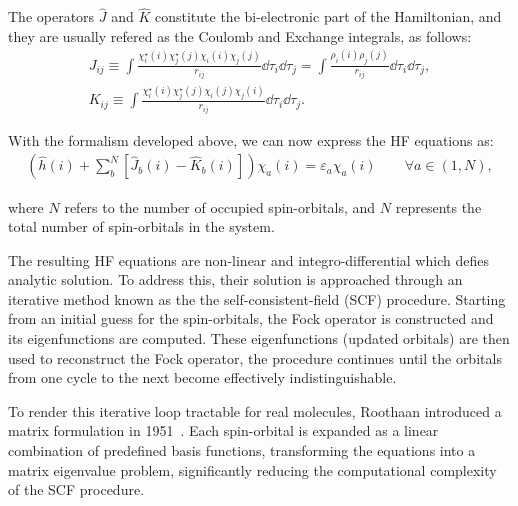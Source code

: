 The operators $\widehat{J}$ and $\hat{K}$ constitute the bi-electronic
part of the Hamiltonian, and they are usually refered as the Coulomb and
Exchange integrals, as follows:
%
\begin{gather}
  J_{ij} \equiv \int\frac{\chi_i^\star(i)\chi_j^\star(j)\chi_i(i)\chi_j(j)}{r_{ij}}
    \dd\tau_i\dd\tau_j =
  \int\frac{\rho_i(i)\rho_j(j)}{r_{ij}}\dd\tau_i\dd\tau_j, \\
  K_{ij} \equiv \int\frac{\chi_i^\star(i)\chi_j^\star(j)\chi_i(j)\chi_j(i)}{r_{ij}}
    \dd\tau_i\dd\tau_j.
\end{gather}
%


\newpage
With the formalism developed above, we can now express the \gls{HF}
equations as:
%
\begin{align}
  \left(\widehat{h}(i) + \sum_b^N [\hat{J}_b (i) - \hat{K}_b (i)]\right)\chi_a (i) =
  \varepsilon_a \chi_a (i) \qquad \forall a \in (1,N),
  \label{HF_forall}
\end{align}

\noindent where $N$ refers to the number of occupied spin-orbitals, and
$N$ represents the total number of spin-orbitals in the system.

The resulting \gls{HF} equations are non-linear and integro-differential which
defies analytic solution. To address this, their solution is approached through
an iterative method known as the the self-consistent-field (\gls{SCF})
procedure. Starting from an initial guess for the spin-orbitals, the Fock
operator is constructed and its eigenfunctions are computed. These
eigenfunctions (updated orbitals) are then used to reconstruct the Fock
operator, the procedure continues until the orbitals from one cycle to the next
become effectively indistinguishable.

To render this iterative loop tractable for real molecules, Roothaan introduced
a matrix formulation in 1951~\cite{Roothaan1951}. Each spin-orbital is expanded
as a linear combination of predefined basis functions, transforming the
equations into a matrix eigenvalue problem, significantly reducing the
computational complexity of the \gls{SCF} procedure.

